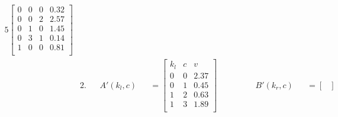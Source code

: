 \begin{figure}[H]
\begin{alignat*}{5}
\begin{bmatrix}
                                                                        0 & 0 & 0   & 0.32 \\
                                                                        0 & 0 & 2   & 2.57 \\
                                                                        0 & 1 & 0   & 1.45 \\
                                                                        0 & 3 & 1   & 0.14 \\
                                                                        1 & 0 & 0   & 0.81 \\
                                                                    \end{bmatrix}
        \\
         & 2.      &                           & A'(k_l, c)     &                                                                                      & = \begin{bmatrix}
                                                                                                                                                               k_l & c & v    \\
                                                                                                                                                               0   & 0 & 2.37 \\
                                                                                                                                                               0   & 1 & 0.45 \\
                                                                                                                                                               1   & 2 & 0.63 \\
                                                                                                                                                               1   & 3 & 1.89 \\
                                                                                                                                                           \end{bmatrix}
         &         & \qquad \quad B'(k_r, c)   &                & = \begin{bmatrix}

\end{bmatrix}
\end{alignat*}
\end{figure}

